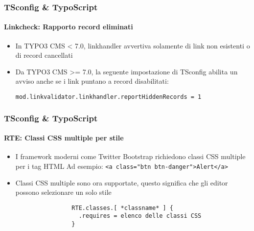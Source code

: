 
\begin{frame}[fragile]
	\frametitle{TSconfig \& TypoScript}
	\framesubtitle{Linkcheck: Rapporto record eliminati}

	\begin{itemize}
		\item In TYPO3 CMS < 7.0, linkhandler avvertiva solamente di link non esistenti o di record cancellati
		\item Da TYPO3 CMS >=  7.0, la seguente impostazione di TSconfig abilita un avviso anche se i link puntano a record disabilitati:

			\lstinline!mod.linkvalidator.linkhandler.reportHiddenRecords = 1!

	\end{itemize}

\end{frame}


\begin{frame}[fragile]
	\frametitle{TSconfig \& TypoScript}
	\framesubtitle{RTE: Classi CSS multiple per stile}

	\begin{itemize}
		\item I framework moderni come Twitter Bootstrap richiedono classi CSS multiple per i tag HTML\newline
			\small Ad esempio: \texttt{<a class="btn btn-danger">Alert</a>}\normalsize
		\item Classi CSS multiple sono ora supportate, questo significa che gli editor possono selezionare un solo stile

			\begin{lstlisting}
				RTE.classes.[ *classname* ] {
				  .requires = elenco delle classi CSS
				}
			\end{lstlisting}

	\end{itemize}

\end{frame}

